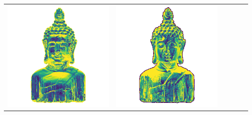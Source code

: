 \begin{tabularx}{\linewidth}{@{}Y@{}Y@{}Y@{}Y@{}Y@{}Y@{}}
\includegraphics[width=\linewidth]{semisynthetic/20160617_16_yu_err.png} &
\includegraphics[width=\linewidth]{semisynthetic/20160617_16_dpsn_err.png} &

\end{tabularx}
